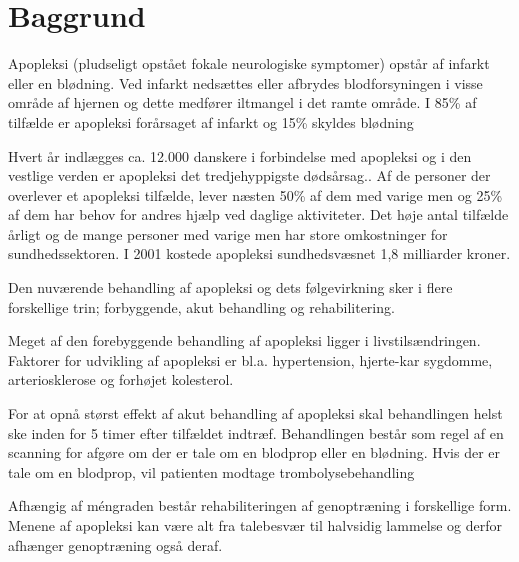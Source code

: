 \chapter{Baggrund} \label{chap:Baggrund}

Apopleksi (pludseligt opstået fokale neurologiske symptomer) opstår af infarkt eller en blødning. Ved infarkt nedsættes eller afbrydes blodforsyningen i visse område af hjernen og dette medfører iltmangel i det ramte område. I 85\% af tilfælde er apopleksi forårsaget af infarkt og 15\% skyldes blødning 

Hvert år indlægges ca. 12.000 danskere i forbindelse med apopleksi og i den vestlige verden er apopleksi det tredjehyppigste dødsårsag.. Af de personer der overlever et apopleksi tilfælde, lever næsten 50\% af dem med varige men og 25\% af dem har behov for andres hjælp ved daglige aktiviteter.  Det høje antal tilfælde årligt og de mange personer med varige men har store omkostninger for sundhedssektoren.  I 2001 kostede apopleksi sundhedsvæsnet 1,8 milliarder kroner. 

Den nuværende behandling af apopleksi og dets følgevirkning sker i flere forskellige trin; forbyggende, akut behandling og rehabilitering. 

Meget af den forebyggende behandling af apopleksi ligger i livstilsændringen. Faktorer for udvikling af apopleksi er bl.a. hypertension, hjerte-kar sygdomme, arteriosklerose og forhøjet kolesterol. 

For at opnå størst effekt af akut behandling af apopleksi skal behandlingen helst ske inden for 5 timer efter tilfældet indtræf. Behandlingen består som regel af en scanning for afgøre om der er tale om en blodprop eller en blødning. Hvis der er tale om en blodprop, vil patienten modtage trombolysebehandling 

Afhængig af méngraden består rehabiliteringen af genoptræning i forskellige form. Menene af apopleksi kan være alt fra talebesvær til halvsidig lammelse og derfor afhænger genoptræning også deraf. 

